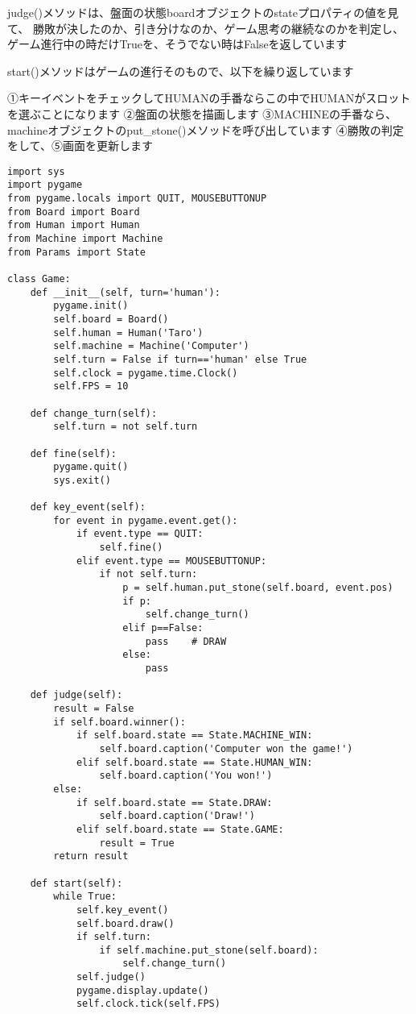 \documentclass[uplatex,a4paper,11pt,oneside,openany]{jsbook}
\begin{document}
judge()メソッドは、盤面の状態boardオブジェクトのstateプロパティの値を見て、
勝敗が決したのか、引き分けなのか、ゲーム思考の継続なのかを判定し、
ゲーム進行中の時だけTrueを、そうでない時はFalseを返しています

start()メソッドはゲームの進行そのもので、以下を繰り返しています

①キーイベントをチェックしてHUMANの手番ならこの中でHUMANがスロットを選ぶことになります
②盤面の状態を描画します
③MACHINEの手番なら、machineオブジェクトのput\_stone()メソッドを呼び出しています
④勝敗の判定をして、⑤画面を更新します

\begin{lstlisting}[caption=class Game,label=prog05-2]
import sys
import pygame
from pygame.locals import QUIT, MOUSEBUTTONUP
from Board import Board
from Human import Human
from Machine import Machine
from Params import State

class Game:
    def __init__(self, turn='human'):
        pygame.init()
        self.board = Board()
        self.human = Human('Taro')
        self.machine = Machine('Computer')
        self.turn = False if turn=='human' else True
        self.clock = pygame.time.Clock()
        self.FPS = 10

    def change_turn(self):
        self.turn = not self.turn

    def fine(self):
        pygame.quit()
        sys.exit()

    def key_event(self):
        for event in pygame.event.get():
            if event.type == QUIT:
                self.fine()
            elif event.type == MOUSEBUTTONUP:
                if not self.turn:
                    p = self.human.put_stone(self.board, event.pos)
                    if p:
                        self.change_turn()
                    elif p==False:
                        pass    # DRAW
                    else:
                        pass

    def judge(self):
        result = False
        if self.board.winner():
            if self.board.state == State.MACHINE_WIN:
                self.board.caption('Computer won the game!')
            elif self.board.state == State.HUMAN_WIN:
                self.board.caption('You won!')
        else:
            if self.board.state == State.DRAW:
                self.board.caption('Draw!')
            elif self.board.state == State.GAME:
                result = True
        return result

    def start(self):
        while True:
            self.key_event()
            self.board.draw()
            if self.turn:
                if self.machine.put_stone(self.board):
                    self.change_turn()
            self.judge()
            pygame.display.update()
            self.clock.tick(self.FPS)
\end{lstlisting}%
\end{document}
